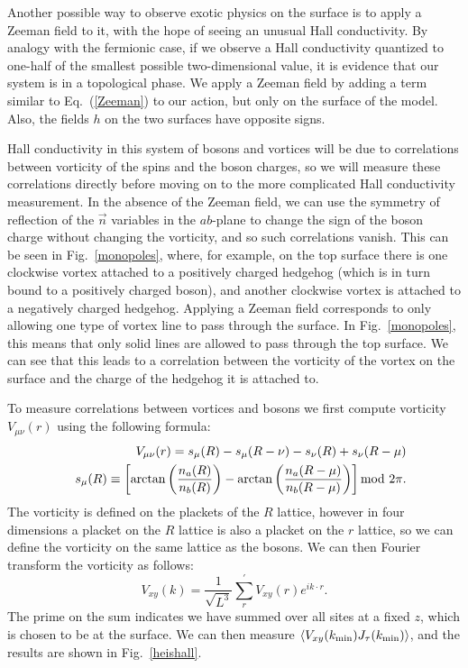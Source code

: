 \documentclass[prb,twocolumn]{revtex4-1}
\def\ra{\rangle} %
\def\la{\langle} %
\begin{document}
Another possible way to observe exotic physics on the surface is to apply a Zeeman field to it, with the hope of seeing an unusual Hall conductivity. By analogy with the fermionic case, if we observe a Hall conductivity quantized to one-half of the smallest possible two-dimensional value, it is evidence that our system is in a topological phase. We apply a Zeeman field by adding a term similar to Eq.~(\ref{Zeeman}) to our action, but only on the surface of the model. Also, the fields $h$ on the two surfaces have opposite signs.

Hall conductivity in this system of bosons and vortices will be due to correlations between vorticity of the spins and the boson charges,\cite{FQHE} so we will measure these correlations directly before moving on to the more complicated Hall conductivity measurement. In the absence of the Zeeman field, we can use the symmetry of reflection of the $\vec n$ variables in the $ab$-plane to change the sign of the boson charge without changing the vorticity, and so such correlations vanish. This can be seen in Fig.~\ref{monopoles}, where, for example, on the top surface there is one clockwise vortex attached to a positively charged hedgehog (which is in turn bound to a positively charged boson), and another clockwise vortex is attached to a negatively charged hedgehog. Applying a Zeeman field corresponds to only allowing one type of vortex line to pass through the surface. In Fig.~\ref{monopoles}, this means that only solid lines are allowed to pass through the top surface. We can see that this leads to a correlation between the vorticity of the vortex on the surface and the charge of the hedgehog it is attached to. 

To measure correlations between vortices and bosons we first compute vorticity $V_{\mu\nu}(r)$ using the following formula:
\begin{eqnarray}
&&V_{\mu\nu}(r)=s_{\mu}(R)-s_{\mu}(R-\nu)-s_{\nu}(R)+s_{\nu}(R-\mu)\\
&&s_{\mu}(R)\equiv \left[\arctan\left(\frac{n_a(R)}{n_b(R)}\right) -\arctan\left(\frac{n_a(R-\mu)}{n_b(R-\mu)}\right)\right]{\rm mod}~2\pi.\nonumber
\end{eqnarray}
The vorticity is defined on the plackets of the $R$ lattice, however in four dimensions a placket on the $R$ lattice is also a placket on the $r$ lattice, so we can define the vorticity on the same lattice as the bosons. We can then Fourier transform the vorticity as follows:
\begin{equation}
V_{xy}(k)=\frac{1}{\sqrt{L^3}}\sum_{r}  ^\prime V_{xy}(r) e^{ik\cdot r}.
\end{equation}
The prime on the sum indicates we have summed over all sites at a fixed $z$, which is chosen to be at the surface. We can then measure $\la V_{xy}(k_{\rm min})J_\tau(k_{\rm min})\ra$, and the results are shown in Fig.~\ref{heishall}. 
\end{document}
